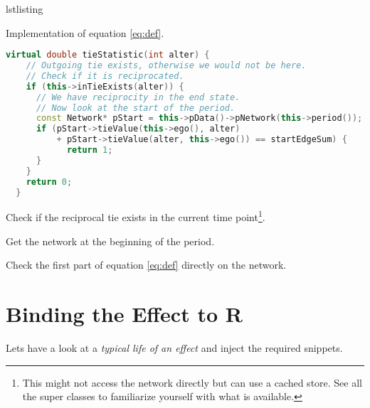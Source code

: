 \documentclass{tufte-handout}
\makeatletter
\newenvironment{listing}[1][htbp]
  {\ifvmode\else\unskip\fi\begin{@tufte@float}[#1]{lstlisting}{}}
  {\end{@tufte@float}}
\def\linestyle{\color{white!50!black}}
\makeatother
\begin{document}
\begin{listing}
\caption{
  Implementation of equation \ref{eq:def}.
}
\begin{lstlisting}[language=c++]
  virtual double tieStatistic(int alter) {
    // Outgoing tie exists, otherwise we would not be here.
    // Check if it is reciprocated.
    if (this->inTieExists(alter)) {
      // We have reciprocity in the end state.
      // Now look at the start of the period.
      const Network* pStart = this->pData()->pNetwork(this->period());
      if (pStart->tieValue(this->ego(), alter)
          + pStart->tieValue(alter, this->ego()) == startEdgeSum) {
            return 1;
      }
    }
    return 0;
  }
\end{lstlisting}
\end{listing}
\begin{description}\itemsep0pt
\item[\linestyle line 4] Check if the reciprocal tie exists in the current time point\footnote{
    This might not access the network directly but can use a cached store.
    See all the super classes to familiarize yourself with what is available.
  }.
\item[\linestyle line 7] Get the network at the beginning of the period.
\item[\linestyle line 8-11] Check the first part of equation \ref{eq:def} directly on the network.
\end{description}

\section{Binding the Effect to R}

Lets have a look at a \emph{typical life of an effect} and inject the required snippets.
\end{document}
